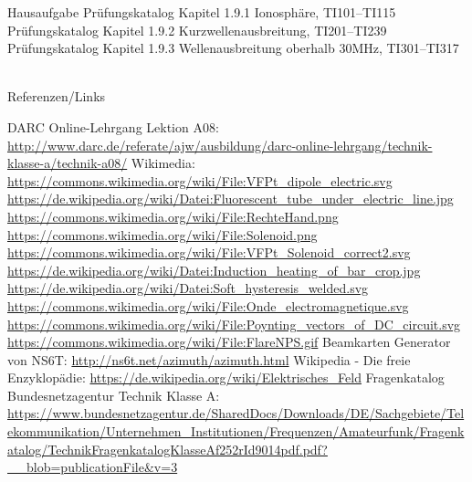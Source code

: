 \begin{frame}
  \begin{exampleblock}{Hausaufgabe}
    Prüfungskatalog Kapitel 1.9.1 Ionosphäre, TI101--TI115\\
    Prüfungskatalog Kapitel 1.9.2 Kurzwellenausbreitung, TI201--TI239\\
    Prüfungskatalog Kapitel 1.9.3 Wellenausbreitung oberhalb 30MHz, TI301--TI317
  \end{exampleblock}
\end{frame}

\renewcommand{\refname}{Referenzen}

\hypertarget{refs}{}
\textcolor{white}{} \\ %
\Large Referenzen/Links
\footnotesize

\begin{thebibliography}{}
      DARC Online-Lehrgang Lektion A08:
                    \url{http://www.darc.de/referate/ajw/ausbildung/darc-online-lehrgang/technik-klasse-a/technik-a08/}
     	Wikimedia:
                    \url{https://commons.wikimedia.org/wiki/File:VFPt_dipole_electric.svg}
                    \url{https://de.wikipedia.org/wiki/Datei:Fluorescent_tube_under_electric_line.jpg}
                    \url{https://commons.wikimedia.org/wiki/File:RechteHand.png}
                    \url{https://commons.wikimedia.org/wiki/File:Solenoid.png}
                    \url{https://commons.wikimedia.org/wiki/File:VFPt_Solenoid_correct2.svg}
                    \url{https://de.wikipedia.org/wiki/Datei:Induction_heating_of_bar_crop.jpg}
                    \url{https://de.wikipedia.org/wiki/Datei:Soft_hysteresis_welded.svg}
                    \url{https://commons.wikimedia.org/wiki/File:Onde_electromagnetique.svg}
                    \url{https://commons.wikimedia.org/wiki/File:Poynting_vectors_of_DC_circuit.svg}
                    \url{https://commons.wikimedia.org/wiki/File:FlareNPS.gif}
                    \url{}
                    \url{}
                    \url{}
                    \url{}
      Beamkarten Generator von NS6T:
                    \url{http://ns6t.net/azimuth/azimuth.html}
        Wikipedia - Die freie Enzyklopädie:
                    \url{https://de.wikipedia.org/wiki/Elektrisches_Feld}
	   Fragenkatalog Bundesnetzagentur Technik Klasse A:                   
                    \url{https://www.bundesnetzagentur.de/SharedDocs/Downloads/DE/Sachgebiete/Telekommunikation/Unternehmen_Institutionen/Frequenzen/Amateurfunk/Fragenkatalog/TechnikFragenkatalogKlasseAf252rId9014pdf.pdf?__blob=publicationFile&v=3}
\end{thebibliography} 


